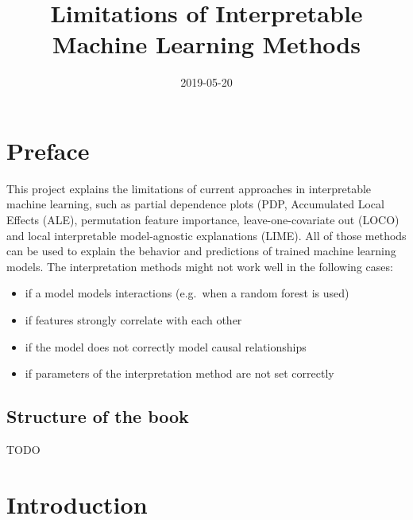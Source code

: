 \documentclass[]{krantz}
\title{Limitations of Interpretable Machine Learning Methods}
\date{2019-05-20}
\providecommand{\tightlist}{%
  \setlength{\itemsep}{0pt}\setlength{\parskip}{0pt}}
\begin{document}
\maketitle


\thispagestyle{empty}

\begin{center}
\end{center}

\setlength{\abovedisplayskip}{-5pt}
\setlength{\abovedisplayshortskip}{-5pt}

{
\hypersetup{linkcolor=black}
\setcounter{tocdepth}{2}
\tableofcontents
}
\listoftables
\listoffigures
\chapter*{Preface}\label{preface}


This project explains the limitations of current approaches in
interpretable machine learning, such as partial dependence plots (PDP,
Accumulated Local Effects (ALE), permutation feature importance,
leave-one-covariate out (LOCO) and local interpretable model-agnostic
explanations (LIME). All of those methods can be used to explain the
behavior and predictions of trained machine learning models. The
interpretation methods might not work well in the following cases:

\begin{itemize}
\tightlist
\item
  if a model models interactions (e.g.~when a random forest is used)
\item
  if features strongly correlate with each other
\item
  if the model does not correctly model causal relationships
\item
  if parameters of the interpretation method are not set correctly
\end{itemize}

\section*{Structure of the book}\label{structure-of-the-book}


TODO

\mainmatter

\chapter{Introduction}\label{introduction}
\end{document}
